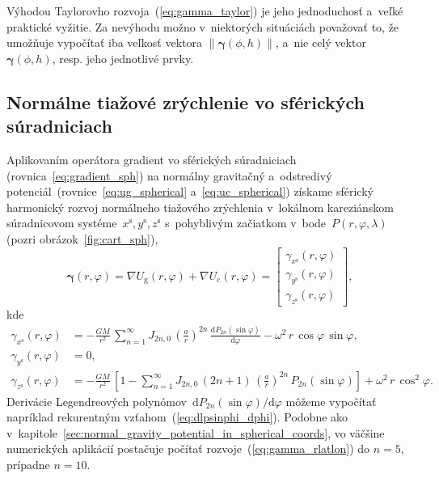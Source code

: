 \documentclass[a4paper, 12pt]{book}
\newcommand{\diff}{\mathrm d}
\newcommand{\gidx}{\mathrm g}
\newcommand{\cidx}{\mathrm c}
\begin{document}
Výhodou Taylorovho rozvoja~(\ref{eq:gamma_taylor}) je jeho jednoduchosť a~veľké 
praktické vyžitie.  Za nevýhodu možno v~niektorých situáciách považovať to, že 
umožňuje vypočítať iba veľkosť vektora $\| \boldsymbol\gamma(\phi, h) \|$, 
a~nie celý vektor~$\boldsymbol \gamma(\phi, h)$, resp. jeho jednotlivé prvky.







\subsection{Normálne tiažové zrýchlenie vo sférických súradniciach}
\label{sec:normal_gravity_in_sph_coords}

Aplikovaním operátora gradient vo sférických súradniciach 
(rovnica~\ref{eq:gradient_sph}) na normálny gravitačný a~odstredivý 
potenciál~(rovnice~\ref{eq:ug_spherical} a~\ref{eq:uc_spherical}) získame 
sférický harmonický rozvoj normálneho tiažového zrýchlenia v~lokálnom 
kareziánskom súradnicovom systéme~$x^\mathrm{s}, y^\mathrm{s}, z^\mathrm{s}$ 
s~pohyblivým začiatkom v~bode~$P(r, \varphi, \lambda)$ (pozri 
obrázok~\ref{fig:cart_sph}),
%
\begin{equation}
\boldsymbol \gamma(r, \varphi) = \nabla U_\gidx(r, \varphi) + \nabla U_\cidx(r, 
\varphi) =
%
\begin{bmatrix}
\gamma_{x^\mathrm{s}}(r, \varphi)\\
\gamma_{y^\mathrm{s}}(r, \varphi)\\
\gamma_{z^\mathrm{s}}(r, \varphi)
\end{bmatrix}
%
{,}
\end{equation}
%
kde
%
\begin{equation}
\label{eq:gamma_rlatlon}
\begin{split}
\gamma_{x^\mathrm{s}}(r, \varphi) &= -\frac{GM}{r^2} \, \sum_{n = 1}^\infty 
J_{2n,0} \, \left( \frac{a}{r} \right)^{2n} \, \frac{\diff 
P_{2n}(\sin\varphi)}{\diff \varphi} -\omega^2 \, r \, \cos\varphi \, 
\sin\varphi{,}\\
\gamma_{y^\mathrm{s}}(r, \varphi) &= 0{,}\\
\gamma_{z^\mathrm{s}}(r, \varphi) &= -\frac{GM}{r^2} \, \left[ 1 - \sum_{n 
= 1}^{\infty} J_{2n,0} \, (2n + 1) \, \left( \frac{a}{r} \right)^{2n} \, 
P_{2n}(\sin\varphi) \right] + \omega^2 \, r \, \cos^2\varphi{.}
\end{split}
\end{equation}
%
Derivácie Legendreových polynómov~$\diff P_{2n}(\sin\varphi) \slash \diff 
\varphi$ môžeme vypočítať napríklad rekurentným 
vzťahom~(\ref{eq:dlpsinphi_dphi}).  Podobne ako 
v~kapitole~\ref{sec:normal_gravity_potential_in_spherical_coords}, vo väčšine 
numerických aplikácií postačuje počítať rozvoje~(\ref{eq:gamma_rlatlon}) do $n 
= 5$, prípadne $n = 10$.
\end{document}
